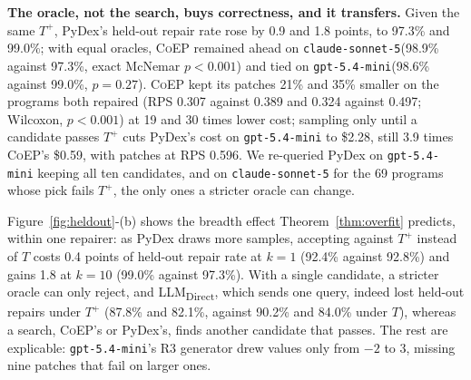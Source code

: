 \documentclass[acmsmall,screen,review,anonymous,nonacm]{acmart}
\newcommand{\tool}{\textsc{CoEP}\xspace}
\newcommand{\direct}{LLM\textsubscript{Direct}\xspace}
\newcommand{\cs}{\texttt{claude-sonnet-5}\xspace}
\newcommand{\gm}{\texttt{gpt-5.4-mini}\xspace}
\begin{document}
\textbf{The oracle, not the search, buys correctness, and it transfers.} Given the same $T^{+}$, PyDex's held-out repair rate rose by 0.9 and 1.8 points, to 97.3\% and 99.0\%; with equal oracles, \tool remained ahead on \cs (98.9\% against 97.3\%, exact McNemar $p < 0.001$) and tied on \gm (98.6\% against 99.0\%, $p = 0.27$). \tool kept its patches 21\% and 35\% smaller on the programs both repaired (RPS 0.307 against 0.389 and 0.324 against 0.497; Wilcoxon, $p < 0.001$) at 19 and 30 times lower cost; sampling only until a candidate passes $T^{+}$ cuts PyDex's cost on \gm to \$2.28, still 3.9 times \tool's \$0.59, with patches at RPS 0.596. We re-queried PyDex on \gm keeping all ten candidates, and on \cs for the 69 programs whose pick fails $T^{+}$, the only ones a stricter oracle can change.

Figure~\ref{fig:heldout}-(b) shows the breadth effect Theorem~\ref{thm:overfit} predicts, within one repairer: as PyDex draws more samples, accepting against $T^{+}$ instead of $T$ costs 0.4 points of held-out repair rate at $k = 1$ (92.4\% against 92.8\%) and gains 1.8 at $k = 10$ (99.0\% against 97.3\%). With a single candidate, a stricter oracle can only reject, and \direct, which sends one query, indeed lost held-out repairs under $T^{+}$ (87.8\% and 82.1\%, against 90.2\% and 84.0\% under $T$), whereas a search, \tool's or PyDex's, finds another candidate that passes. The rest are explicable: \gm's R3 generator drew values only from $-2$ to $3$, missing nine patches that fail on larger ones.
\end{document}

